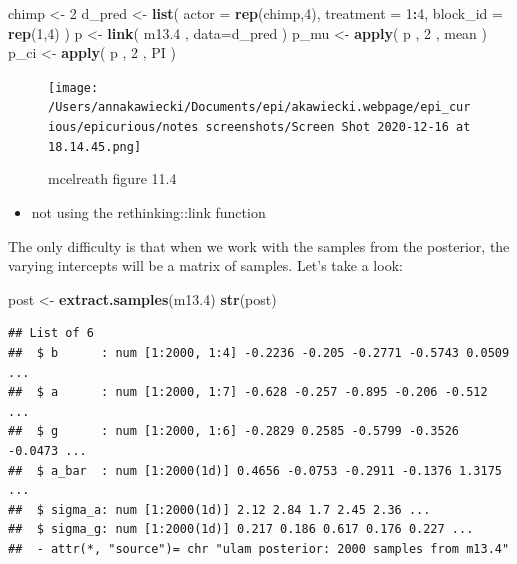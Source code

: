 \documentclass[
]{article}
\newenvironment{Shaded}{\begin{snugshade}}{\end{snugshade}}
\newcommand{\DataTypeTok}[1]{\textcolor[rgb]{0.13,0.29,0.53}{#1}}
\newcommand{\DecValTok}[1]{\textcolor[rgb]{0.00,0.00,0.81}{#1}}
\newcommand{\FloatTok}[1]{\textcolor[rgb]{0.00,0.00,0.81}{#1}}
\newcommand{\KeywordTok}[1]{\textcolor[rgb]{0.13,0.29,0.53}{\textbf{#1}}}
\newcommand{\NormalTok}[1]{#1}
\newcommand{\OperatorTok}[1]{\textcolor[rgb]{0.81,0.36,0.00}{\textbf{#1}}}
\newcommand{\StringTok}[1]{\textcolor[rgb]{0.31,0.60,0.02}{#1}}
\providecommand{\tightlist}{%
  \setlength{\itemsep}{0pt}\setlength{\parskip}{0pt}}
\begin{document}
\begin{Shaded}
\begin{Highlighting}[]
\NormalTok{chimp <-}\StringTok{ }\DecValTok{2} 
\NormalTok{d_pred <-}\StringTok{ }\KeywordTok{list}\NormalTok{(}
\DataTypeTok{actor =} \KeywordTok{rep}\NormalTok{(chimp,}\DecValTok{4}\NormalTok{), }\DataTypeTok{treatment =} \DecValTok{1}\OperatorTok{:}\DecValTok{4}\NormalTok{, }\DataTypeTok{block_id =} \KeywordTok{rep}\NormalTok{(}\DecValTok{1}\NormalTok{,}\DecValTok{4}\NormalTok{)}
\NormalTok{)}
\NormalTok{p <-}\StringTok{ }\KeywordTok{link}\NormalTok{( m13}\FloatTok{.4}\NormalTok{ , }\DataTypeTok{data=}\NormalTok{d_pred ) }
\NormalTok{p_mu <-}\StringTok{ }\KeywordTok{apply}\NormalTok{( p , }\DecValTok{2}\NormalTok{ , mean ) }
\NormalTok{p_ci <-}\StringTok{ }\KeywordTok{apply}\NormalTok{( p , }\DecValTok{2}\NormalTok{ , PI )}
\end{Highlighting}
\end{Shaded}

\begin{figure}
\centering
\texttt{[image: /Users/annakawiecki/Documents/epi/akawiecki.webpage/epi\_curious/epicurious/notes screenshots/Screen Shot 2020-12-16 at 18.14.45.png]}
\caption{mcelreath figure 11.4}
\end{figure}

\begin{itemize}
\tightlist
\item
  not using the rethinking::link function
\end{itemize}

The only difficulty is that when we work with the samples from the
posterior, the varying intercepts will be a matrix of samples. Let's
take a look:

\begin{Shaded}
\begin{Highlighting}[]
\NormalTok{post <-}\StringTok{ }\KeywordTok{extract.samples}\NormalTok{(m13}\FloatTok{.4}\NormalTok{) }
\KeywordTok{str}\NormalTok{(post)}
\end{Highlighting}
\end{Shaded}

\begin{verbatim}
## List of 6
##  $ b      : num [1:2000, 1:4] -0.2236 -0.205 -0.2771 -0.5743 0.0509 ...
##  $ a      : num [1:2000, 1:7] -0.628 -0.257 -0.895 -0.206 -0.512 ...
##  $ g      : num [1:2000, 1:6] -0.2829 0.2585 -0.5799 -0.3526 -0.0473 ...
##  $ a_bar  : num [1:2000(1d)] 0.4656 -0.0753 -0.2911 -0.1376 1.3175 ...
##  $ sigma_a: num [1:2000(1d)] 2.12 2.84 1.7 2.45 2.36 ...
##  $ sigma_g: num [1:2000(1d)] 0.217 0.186 0.617 0.176 0.227 ...
##  - attr(*, "source")= chr "ulam posterior: 2000 samples from m13.4"
\end{verbatim}
\end{document}
